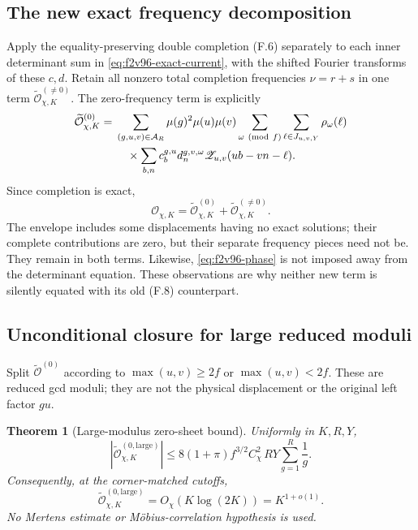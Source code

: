 \documentclass[11pt]{article}
\newtheorem{theorem}{Theorem}[section]
\theoremstyle{definition}
\theoremstyle{remark}
\begin{document}
\subsection{The new exact frequency decomposition}

Apply the equality-preserving double completion (F.6) separately to
each inner determinant sum in \eqref{eq:f2v96-exact-current}, with
the shifted Fourier transforms of these \(c,d\).  Retain all
nonzero total completion frequencies \(\nu=r+s\) in one term
\(\widetilde{\mathcal O}_{\chi,K}^{(\ne0)}\).  The zero-frequency
term is explicitly
\begin{equation}
\begin{split}
 \widetilde{\mathcal O}_{\chi,K}^{(0)}
 ={}&\sum_{(g,u,v)\in\mathcal A_R}\mu(g)^2\mu(u)\mu(v)
    \sum_{\omega\ ({\rm mod}\ f)}\sum_{\ell\in J_{u,v,Y}}
       \rho_\omega(\ell)\\
 &\hspace{1em}\times\sum_{b,n}c_b^{g,u}d_n^{g,v,\omega}
               \mathscr Z_{u,v}(ub-vn-\ell).
\end{split}
 \label{eq:f2v96-zero-sheet}
\end{equation}
Since completion is exact,
\begin{equation}
 \mathcal O_{\chi,K}
 =\widetilde{\mathcal O}_{\chi,K}^{(0)}
  +\widetilde{\mathcal O}_{\chi,K}^{(\ne0)}.
 \label{eq:f2v96-frequency-sum}
\end{equation}
The envelope includes some displacements having no exact solutions;
their complete contributions are zero, but their separate frequency
pieces need not be.  They remain in both terms.  Likewise,
\eqref{eq:f2v96-phase} is not imposed away from the determinant
equation.  These observations are why neither new term is silently
equated with its old (F.8) counterpart.

\subsection{Unconditional closure for large reduced moduli}

Split \(\widetilde{\mathcal O}^{(0)}\) according to
\(\max(u,v)\ge2f\) or \(\max(u,v)<2f\).  These are reduced
gcd moduli; they are not the physical displacement or the original
left factor \(gu\).

\begin{theorem}[Large-modulus zero-sheet bound]
\label{thm:f2v96-large-zero}
Uniformly in \(K,R,Y\),
\begin{equation}
 \left|\widetilde{\mathcal O}_{\chi,K}^{(0,\mathrm{large})}\right|
 \le 8(1+\pi)f^{3/2}C_\chi^2\,RY
                  \sum_{g=1}^{R}\frac1g.
 \label{eq:f2v96-large-bound}
\end{equation}
Consequently, at the corner-matched cutoffs,
\begin{equation}
 \widetilde{\mathcal O}_{\chi,K}^{(0,\mathrm{large})}
 =O_\chi(K\log(2K))=K^{1+o(1)}.
 \label{eq:f2v96-large-scale}
\end{equation}
No Mertens estimate or M\"obius-correlation hypothesis is used.
\end{theorem}
\end{document}
